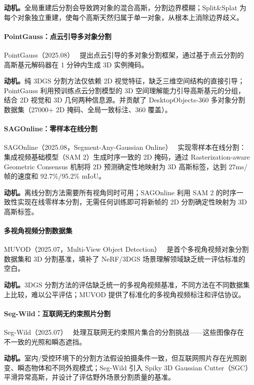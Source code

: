 \textbf{动机。}全局重建后分割会导致跨对象的混合高斯，分割边界模糊；Split\&Splat 为每个对象独立重建，使每个高斯天然归属于单一对象，从根本上消除边界歧义。

\paragraph{PointGauss：点云引导多对象分割} PointGauss（2025.08）~\cite{2508_00259} 提出点云引导的多对象分割框架，通过基于点云分割的高斯基元解码器在 1 分钟内生成 3D 实例掩码。

\textbf{动机。}纯 3DGS 分割方法仅依赖 2D 视觉特征，缺乏三维空间结构的直接引导；PointGauss 利用预训练点云分割模型的 3D 空间理解能力引导高斯基元的分组，结合 2D 视觉和 3D 几何两种信息源。并贡献了 DesktopObjects-360 多对象分割数据集（27000+ 2D 掩码、全局一致标注、360\textdegree{} 覆盖）。

\paragraph{SAGOnline：零样本在线分割} SAGOnline（2025.08，Segment-Any-Gaussian Online）~\cite{2508_08219} 实现零样本在线分割：集成视频基础模型（SAM 2）生成时序一致的 2D 掩码，通过 Rasterization-aware Geometric Consensus 机制将 2D 预测确定性地映射为 3D 高斯标签，达到 27ms/帧的速度和 92.7\%/95.2\% mIoU。

\textbf{动机。}离线分割方法需要所有视角同时可用；SAGOnline 利用 SAM 2 的时序一致性实现在线零样本分割，无需任何训练即可将新帧的 2D 分割确定性映射为 3D 高斯标签。

\paragraph{多视角视频分割数据集} MUVOD（2025.07，Multi-View Object Detection）~\cite{2507_07519} 是首个多视角视频对象分割数据集和 3D 分割基准，填补了 NeRF/3DGS 场景理解领域缺乏统一评估标准的空白。

\textbf{动机。}3DGS 分割方法的评估缺乏统一的多视角视频基准，不同方法在不同数据集上比较，难以公平评估；MUVOD 提供了标准化的多视角视频标注和评估协议。

\paragraph{Seg-Wild：互联网无约束照片分割} Seg-Wild（2025.07）~\cite{2507_07395} 处理互联网无约束照片集合的分割挑战——这些图像存在不一致的光照和瞬态遮挡。

\textbf{动机。}室内/受控环境下的分割方法假设拍摄条件一致，但互联网照片存在光照剧变、瞬态物体和不同外观模式；Seg-Wild 引入 Spiky 3D Gaussian Cutter（SGC）平滑异常高斯，并设计了评估野外场景分割质量的基准。

